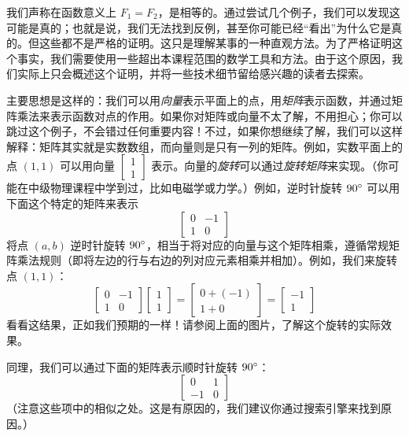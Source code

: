 \begin{example}
    我们声称在函数意义上 $F_1 = F_2$，是相等的。通过尝试几个例子，我们可以发现这可能是真的；也就是说，我们无法找到反例，甚至你可能已经``看出''为什么它是真的。但这些都不是严格的证明。这只是理解某事的一种直观方法。为了严格证明这个事实，我们需要使用一些超出本课程范围的数学工具和方法。由于这个原因，我们实际上只会概述这个证明，并将一些技术细节留给感兴趣的读者去探索。

    主要思想是这样的：我们可以用\emph{向量}表示平面上的点，用\emph{矩阵}表示函数，并通过矩阵乘法来表示函数对点的作用。如果你对矩阵或向量不太了解，不用担心；你可以跳过这个例子，不会错过任何重要内容！不过，如果你想继续了解，我们可以这样解释：矩阵其实就是实数数组，而向量则是只有一列的矩阵。例如，实数平面上的点 $(1, 1)$ 可以用向量 $\begin{bmatrix}
        1 \\
        1
     \end{bmatrix}$ 表示。向量的\emph{旋转}可以通过\emph{旋转矩阵}来实现。（你可能在中级物理课程中学到过，比如电磁学或力学。）例如，逆时针旋转 $90 ^\circ$ 可以用下面这个特定的矩阵来表示
     \[\begin{bmatrix}
        0 & -1 \\
        1 & 0
     \end{bmatrix}\]
     将点 $(a, b)$ 逆时针旋转 $90 ^\circ$，相当于将对应的向量与这个矩阵相乘，遵循常规矩阵乘法规则（即将左边的行与右边的列对应元素相乘并相加）。例如，我们来旋转点 $(1, 1)$：
     \[\begin{bmatrix}
        0 & -1 \\
        1 & 0
     \end{bmatrix}\begin{bmatrix}
        1 \\
        1
     \end{bmatrix} = \begin{bmatrix}
        0+(-1) \\
        1+0
     \end{bmatrix}=\begin{bmatrix}
        -1 \\
        1
     \end{bmatrix}\]
     看看这结果，正如我们预期的一样！请参阅上面的图片，了解这个旋转的实际效果。

     同理，我们可以通过下面的矩阵表示顺时针旋转 $90 ^\circ$：
     \[\begin{bmatrix}
        0 & 1 \\
        -1 & 0
     \end{bmatrix}\]
     （注意这些项中的相似之处。这是有原因的，我们建议你通过搜索引擎来找到原因。）


\end{example}
